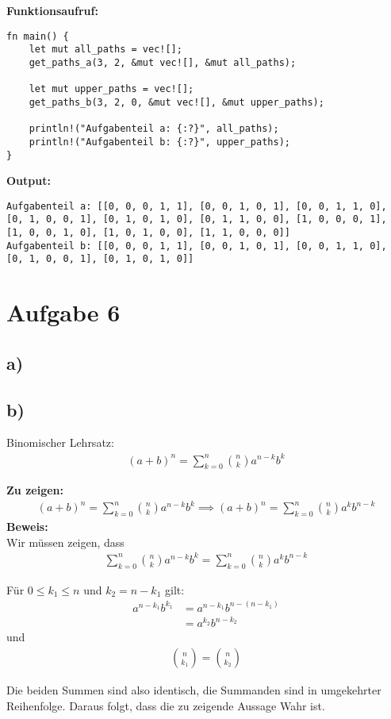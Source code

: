 \documentclass[a4paper]{scrartcl}
\begin{document}
\textbf{Funktionsaufruf:}
\begin{lstlisting}
fn main() {
    let mut all_paths = vec![];
    get_paths_a(3, 2, &mut vec![], &mut all_paths);

    let mut upper_paths = vec![];
    get_paths_b(3, 2, 0, &mut vec![], &mut upper_paths);

    println!("Aufgabenteil a: {:?}", all_paths);
    println!("Aufgabenteil b: {:?}", upper_paths);
}
\end{lstlisting}

\textbf{Output:}
\begin{lstlisting}
Aufgabenteil a: [[0, 0, 0, 1, 1], [0, 0, 1, 0, 1], [0, 0, 1, 1, 0], 
[0, 1, 0, 0, 1], [0, 1, 0, 1, 0], [0, 1, 1, 0, 0], [1, 0, 0, 0, 1], 
[1, 0, 0, 1, 0], [1, 0, 1, 0, 0], [1, 1, 0, 0, 0]]
Aufgabenteil b: [[0, 0, 0, 1, 1], [0, 0, 1, 0, 1], [0, 0, 1, 1, 0], 
[0, 1, 0, 0, 1], [0, 1, 0, 1, 0]]
\end{lstlisting}

\section*{Aufgabe 6}
\subsection*{a)}

\subsection*{b)}
Binomischer Lehrsatz:
\begin{align*}
    (a + b)^n = \sum_{k=0}^{n} \binom{n}{k} a^{n-k} b^k
\end{align*}

\textbf{Zu zeigen:}
\begin{align*}
    (a + b)^n = \sum_{k=0}^{n} \binom{n}{k} a^{n-k} b^k \implies (a + b)^n = \sum_{k=0}^{n} \binom{n}{k} a^{k} b^{n-k}
\end{align*}
\textbf{Beweis:} \\
Wir müssen zeigen, dass
\begin{align*}
    \sum_{k=0}^{n} \binom{n}{k} a^{n-k} b^k = \sum_{k=0}^{n} \binom{n}{k} a^k b^{n-k}
\end{align*}

Für $0 \le k_1 \le n$ und $k_2 = n - k_1$ gilt:
\begin{align}
    a^{n-k_1} b^{k_1} &= a^{n - k_1} b^{n - (n - k_1)} \\
    &= a^{k_2} b^{n-k_2} 
\end{align}
und 
\begin{align*}
    \binom{n}{k_1} = \binom{n}{k_2}
\end{align*}

Die beiden Summen sind also identisch, die Summanden sind in umgekehrter Reihenfolge. 
Daraus folgt, dass die zu zeigende Aussage Wahr ist.
\end{document}
